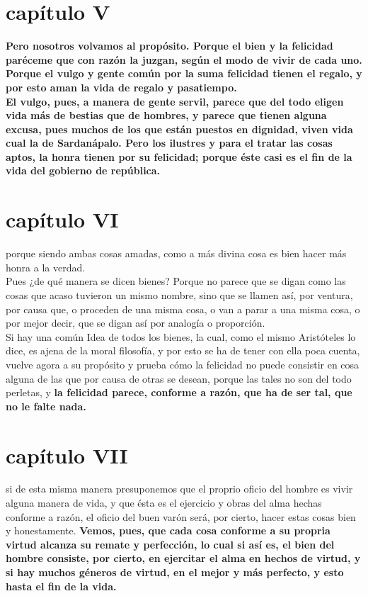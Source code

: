 \begin{multicols}{2}
\section*{capítulo V}
\textbf{Pero nosotros volvamos al propósito. Porque el bien y la felicidad paréceme que con razón la juzgan, según el modo de vivir de cada uno. Porque el vulgo y gente común por la suma felicidad tienen el regalo, y por esto aman la vida de regalo y pasatiempo.}\\
\textbf{ El vulgo, pues, a manera de gente servil, parece que del todo eligen vida más de bestias que de hombres, y parece que tienen alguna excusa, pues muchos de los que están puestos en dignidad, viven vida cual la de Sardanápalo. Pero los ilustres y para el tratar las cosas aptos, la honra tienen por su felicidad; porque éste casi es el fin de la vida del gobierno de república.}\\

\section*{capítulo VI}
porque siendo ambas cosas amadas, como a más divina cosa es bien hacer más honra a la verdad.\\
Pues ¿de qué manera se dicen bienes? Porque no parece que se digan como las cosas que acaso tuvieron un mismo nombre, sino que se llamen así, por ventura, por causa que, o proceden de una misma cosa, o van a parar a una misma cosa, o por mejor decir, que se digan así por analogía o proporción.\\ 
Si hay una común Idea de todos los bienes, la cual, como el mismo Aristóteles lo dice, es ajena de la moral filosofía, y por esto se ha de tener con ella poca cuenta, vuelve agora a su propósito y prueba cómo la felicidad no puede consistir en cosa alguna de las que por causa de otras se desean, porque las tales no son del todo perletas, y \textbf{la felicidad parece, conforme a razón, que ha de ser tal, que no le falte nada.}

\section*{capítulo VII}
si de esta misma manera presuponemos que el proprio oficio del hombre es vivir alguna manera de vida, y que ésta es el ejercicio y obras del alma hechas conforme a razón, el oficio del buen varón será, por cierto, hacer estas cosas bien y honestamente. \textbf{Vemos, pues, que cada cosa conforme a su propria virtud alcanza su remate y perfección, lo cual si así es, el bien del hombre consiste, por cierto, en ejercitar el alma en hechos de virtud, y si hay muchos géneros de virtud, en el mejor y más perfecto, y esto hasta el fin de la vida.}\\


\end{multicols}
